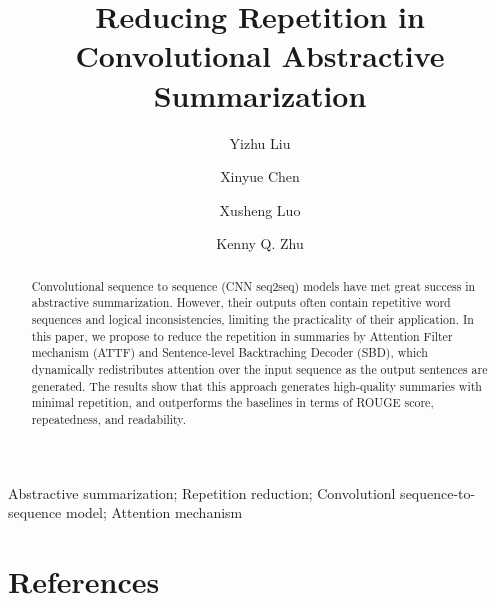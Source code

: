 \documentclass[review]{elsarticle}
\theoremstyle{definition}
\begin{document}
\begin{frontmatter}

\title{Reducing Repetition in Convolutional Abstractive Summarization}

\author[mymainaddress]{Yizhu Liu}
\author[mymainaddress]{Xinyue Chen} 
\author[mysecondaryaddress]{Xusheng Luo} 
\author[mymainaddress]{Kenny Q. Zhu}
\address[mymainaddress]{Department of Computer Science and Engineering, Shanghai Jiao Tong University, Shanghai, China}
\address[mysecondaryaddress]{Search and Recommendation Team, Alibaba Group,
Hangzhou, China}

\begin{abstract}
Convolutional sequence to sequence (CNN seq2seq) models
have met great success in abstractive summarization. 
However, their outputs often contain repetitive word sequences and logical
inconsistencies, limiting the practicality of their application.
In this paper, we propose to reduce the repetition in summaries
by Attention Filter mechanism (ATTF) and Sentence-level Backtraching Decoder (SBD),
which dynamically redistributes attention over the input sequence as
the output sentences are generated.
The results show that this approach 
generates high-quality summaries with minimal repetition, 
and outperforms the baselines 
in terms of
ROUGE score, repeatedness, and readability.
\end{abstract}

\begin{keyword}
Abstractive summarization;
Repetition reduction;
Convolutionl sequence-to-sequence model; Attention mechanism 
\end{keyword}

\end{frontmatter}
\linenumbers






\section*{References}


\end{document}
